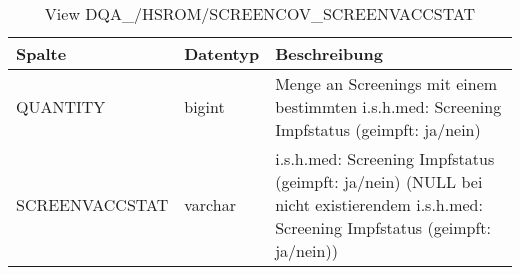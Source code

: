   \begin{table}[ht]
    \centering
    \caption{View DQA\_/HSROM/SCREENCOV\_SCREENVACCSTAT}
    \label{tab:dqa/hsrom/screencovscreenvaccstat}
    \begin{tabular}{||l|l|p{10cm}||}
      \hline
      Spalte & Datentyp & Beschreibung \\ [0.5ex] \hline \hline
      QUANTITY & bigint & Menge an Screenings mit einem bestimmten i.s.h.med: Screening Impfstatus (geimpft: ja/nein) \\ \hline
      SCREENVACCSTAT & varchar & i.s.h.med: Screening Impfstatus (geimpft: ja/nein) (NULL bei nicht existierendem i.s.h.med: Screening Impfstatus (geimpft: ja/nein))\\ \hline
    \end{tabular}
  \end{table}
 \clearpage
